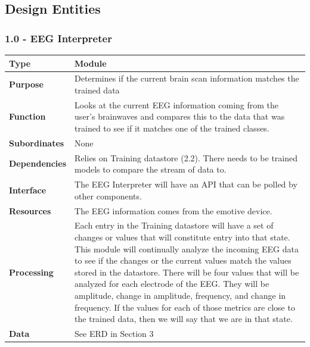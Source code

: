 \documentclass{article}
\begin{document}
\subsection{Design Entities}

\subsubsection*{1.0 - EEG Interpreter}
\begin{tabular}{ | l |  p{13.3cm} |}
\hline
\textbf{Type} & Module \\ \hline
\textbf{Purpose} & Determines if the current brain scan information matches the trained data \\ \hline
\textbf{Function} & Looks at the current EEG information coming from the user's brainwaves and compares this to the data that was trained to see if it matches one of the trained classes. \\ \hline
\textbf{Subordinates} & None \\ \hline
\textbf{Dependencies} & Relies on Training datastore (2.2). There needs to be trained models to compare the stream of data to. \\ \hline
\textbf{Interface} & The EEG Interpreter will have an API that can be polled by other components. \\ \hline
\textbf{Resources} & The EEG information comes from the emotive device. \\ \hline
\textbf{Processing} & Each entry in the Training datastore will have a set of changes or values that will constitute entry into that state. This module will continually analyze the incoming EEG data to see if the changes or the current values match the values stored in the datastore. There will be four values that will be analyzed for each electrode of the EEG. They will be amplitude, change in amplitude, frequency, and change in frequency. If the values for each of those metrics are close to the trained data, then we will say that we are in that state.\\ \hline
\textbf{Data} & See ERD in Section 3 \\ \hline
\end{tabular}
\end{document}
